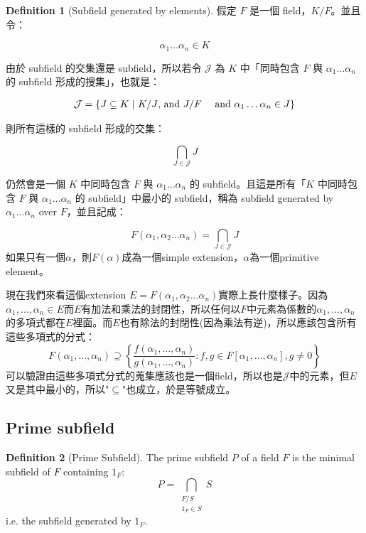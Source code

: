 \documentclass[12pt]{article}
\theoremstyle{definition}
\newtheorem{dfn}{Definition}
\begin{document}
\begin{dfn}[Subfield generated by elements]
	假定 $F$ 是一個 field，$K/F$。並且令：

	$$
		\alpha_1 \dots \alpha_n \in K
	$$

	由於 subfield 的交集還是 subfield，所以若令 $\mathcal J$ 為 $K$ 中「同時包含 $F$ 與 $\alpha_1 \dots \alpha_n$ 的 subfield 形成的搜集」，也就是：

	$$
		\begin{aligned}
			\mathcal J = \{J \subseteq K  \mid\  & K/J \text{, and }J/F
			\newline
			                                     & \text{ and } \alpha_1 \dots \alpha_n \in J\}
		\end{aligned}
	$$

	則所有這樣的 subfield 形成的交集：

	$$
		\bigcap_{J \in \mathcal J}J
	$$

	仍然會是一個 $K$ 中同時包含 $F$ 與 $\alpha_1 \dots \alpha_n$ 的 subfield。且這是所有「$K$ 中同時包含 $F$ 與 $\alpha_1 \dots \alpha_n$ 的 subfield」中最小的 subfield，稱為 subfield generated by $\alpha_1 \dots \alpha_n$ over $F$，並且記成：

	$$
		F(\alpha_1, \alpha_2 \dots \alpha_n) = \bigcap_{J \in \mathcal J}J
	$$
	如果只有一個$\alpha$，則$F(\alpha)$成為一個simple extension，$\alpha$為一個primitive element。
\end{dfn}

現在我們來看這個extension $E=F(\alpha_1, \alpha_2 \dots \alpha_n)$實際上長什麼樣子。因為$\alpha_1, \dots, \alpha_n\in E$而$E$有加法和乘法的封閉性，所以任何以$F$中元素為係數的$\alpha_1, \dots, \alpha_n$的多項式都在$E$裡面。而$E$也有除法的封閉性(因為乘法有逆)，所以應該包含所有這些多項式的分式：
\[
	F(\alpha_1, \dots, \alpha_n)\supseteq\left\{
	\frac{f(\alpha_1, \dots, \alpha_n)}{g(\alpha_1, \dots, \alpha_n)}: f,g\in F[\alpha_1, \dots, \alpha_n], g\neq 0
	\right\}
\]
可以驗證由這些多項式分式的蒐集應該也是一個field，所以也是$\mathcal J$中的元素，但$E$又是其中最小的，所以"$\subseteq$"也成立，於是等號成立。

\subsection{Prime subfield}

\begin{dfn}[Prime Subfield]
	The prime subfield $P$ of a field $F$ is the minimal subfield of $F$ containing $1_F$:
	\[
		P=\bigcap_{
			\substack{F/S \\ 1_F\in S}
		} S
	\]
	i.e. the subfield generated by $1_F$.
\end{dfn}
\end{document}

